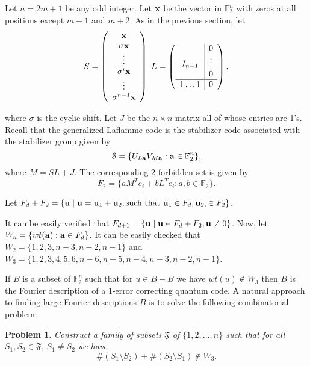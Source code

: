 \documentclass{Rinton-P9x6}
\newtheorem{problem}[theorem]{Problem}
\newcommand{\GF}[2][]{{\ensuremath{\mathbb{F}_{#2}^{#1}}}}
\renewcommand{\a}{{\bf a}}
\renewcommand{\u}{{\bf u}}
\renewcommand{\S}{{\ensuremath{\mathcal{S}}}}
\begin{document}
Let $n=2m+1$ be any odd integer.  Let ${\bf x }$ be the vector in
$\GF[n]{2}$ with zeros at all positions except $m+1$ and $m+2$. As in
the previous section, let
\[
S = \left( \begin{array}{c}
                    {\bf x}\\
                    \sigma{\bf x}\\
                    \vdots\\
                    \sigma^i{\bf x}\\
                    \vdots\\
                    \sigma^{n-1}{\bf x}
                  \end{array}
                \right)\  L =
                \left( 
                 \begin{array}{c|c}
                    &  0\\
                    I_{n-1}   & \vdots \\
                    & 0 \\
                    \hline
                    1 \ldots 1     & 0 
                  \end{array}
                \right),
\] 

where $\sigma$ is the cyclic shift. Let $J$ be the $n \times n$ matrix
all of whose entries are 1's.  Recall that the generalized Laflamme
code is the stabilizer code associated with the stabilizer group given
by
\[
\S = \{ U_{L\a} V_{M \a } : \a \in \GF[n]{2} \},
\]
where $M = S L + J$. The corresponding 2-forbidden set is given by 
\[
F_2 = \{ a M^T e_i + b L^T e_i : a,b \in \GF{2} \}.
\]

Let $F_d + F_2=\{\u\mid \u=\u_1+\u_2,\hbox{\textrm such that }
\u_1\in F_d, \u_2,\in F_2\}$.

It can be easily verified that $F_{d + 1} = \{\u\mid \u\in F_d + F_2,
\u\neq 0\}$. Now, let $W_d = \{ wt(\a) : \a \in F_d \}$. It can be
easily checked that $W_2 = \{1,2,3,n-3,n-2,n-1\}$ and $W_3 = \{ 1,2,
3, 4, 5, 6, n-6,n-5,n- 4, n-3 , n-2 , n-1 \}$.

If $B$ is a subset of $\GF[n]{2}$ such that for $u \in B - B$ we have
$wt(u) \not \in W_3$ then $B$ is the Fourier description of a 1-error
correcting quantum code. A natural approach to finding large Fourier
descriptions $B$ is to solve the following combinatorial problem.

\begin{problem}\label{prob1}
Construct a family of subsets $\mathfrak{F}$ of
$\{1,2,\ldots,n\}$ such that for all $S_1,S_2 \in \mathfrak{F}$, $S_1
\ne S_2$ we have
\[ 
\# (S_1 \setminus S_2) + \# (S_2\setminus S_1) \not\in W_3. 
\]
\end{problem}
\end{document}
